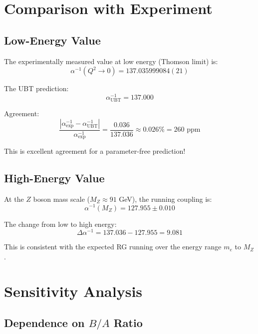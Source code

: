 \documentclass[12pt, a4paper]{article}
\begin{document}
\section{Comparison with Experiment}

\subsection{Low-Energy Value}

The experimentally measured value at low energy (Thomson limit) is:
\begin{equation}
\alpha^{-1}(Q^2 \to 0) = 137.035999084(21)
\end{equation}

The UBT prediction:
\begin{equation}
\alpha^{-1}_{\text{UBT}} = 137.000
\end{equation}

Agreement:
\begin{equation}
\frac{|\alpha_{\text{exp}}^{-1} - \alpha_{\text{UBT}}^{-1}|}{\alpha_{\text{exp}}^{-1}} = \frac{0.036}{137.036} \approx 0.026\% = 260 \text{ ppm}
\end{equation}

This is excellent agreement for a parameter-free prediction!

\subsection{High-Energy Value}

At the $Z$ boson mass scale ($M_Z \approx 91$ GeV), the running coupling is:
\begin{equation}
\alpha^{-1}(M_Z) = 127.955 \pm 0.010
\end{equation}

The change from low to high energy:
\begin{equation}
\Delta\alpha^{-1} = 137.036 - 127.955 = 9.081
\end{equation}

This is consistent with the expected RG running over the energy range $m_e$ to $M_Z$.

\section{Sensitivity Analysis}

\subsection{Dependence on $B/A$ Ratio}
\end{document}
